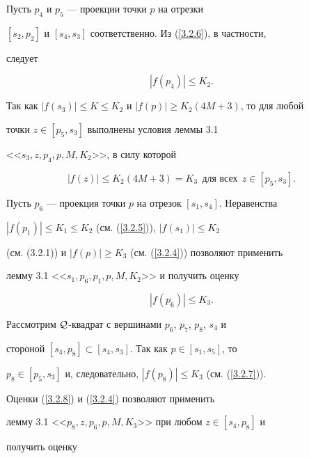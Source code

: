 \begin{pf}
Пусть $p_4$ и $p_5$ --- проекции точки $p$ на отрезки 


$[s_2, p_2]$ и $[s_4, s_3]$ соответственно. Из (\ref{3.2.6}), в частности, 


следует


\begin{equation}


\label{30.2.7}


|f(p_4)| \leq K_2.


\end{equation}


Так как $|f(s_3)| \leq K \leq K_2$ и $|f(p)|\geq K_2(4M+3)$, то для любой 


точки $z\in [p_5, s_3]$ выполнены условия леммы 3.1 


<<$s_3, z, p_4, p, M, K_2 $>>, в силу которой


\begin{equation}


\label{3.2.7}


|f(z)| \leq K_2(4M+3) = K_3 \ \ \text{для всех} \ \ z\in [p_5, s_3].


\end{equation}


Пусть $p_6$ --- проекция точки $p$ на отрезок $[s_1, s_4]$. Неравенства 


$|f(p_1)|\leq K_1 \leq K_2$ (см. (\ref{3.2.5})), $|f(s_1)|\leq K_2$ 


(см. (3.2.1)) и $|f(p)| \geq K_3$ (см. (\ref{3.2.4})) позволяют применить 


лемму 3.1 <<$s_1, p_6, p_1, p, M, K_2$>> и получить оценку


\begin{equation} 


\label{3.2.8}


|f(p_6)| \leq K_3.


\end{equation}


Рассмотрим ${\cal Q}$-квадрат с вершинами $p_6$, $p_7$, $p_8$, $s_4$ и 


стороной $[s_4, p_8] \subset [s_4, s_3]$. Так как $p\in [s_1, s_5]$, то 


$p_8 \in [p_5,s_3]$ и, следовательно, $|f(p_8)| \leq K_3$ (см. (\ref{3.2.7})). 


Оценки (\ref{3.2.8}) и (\ref{3.2.4}) позволяют применить 


лемму 3.1 <<$p_8, z, p_6, p, M, K_3$>> при любом $z\in [s_4, p_8]$ и 


получить оценку



\end{pf}
